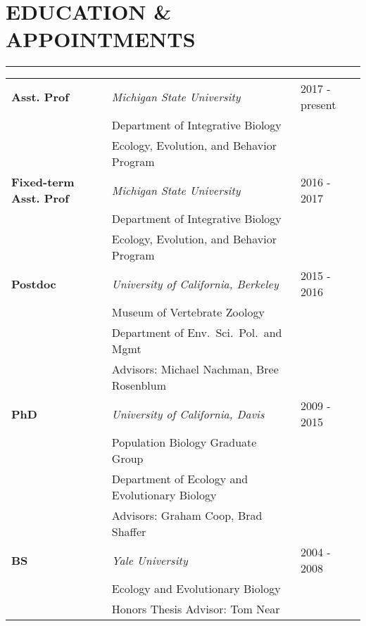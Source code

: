 \documentclass{article}
\begin{document}
\section*{EDUCATION \& APPOINTMENTS}
\vspace{-0.6cm}
\rule{470pt}{0.4pt}
%
\begin{tabular}{p{} p{} p{}} 
\\
\bf{Asst. Prof} & \it{Michigan State University} & \hfill 2017 - present\\
 & \hspace{0.5cm}Department of Integrative Biology & \\
 & \hspace{0.5cm}Ecology, Evolution, and Behavior Program& \\
%
%
\bf{Fixed-term Asst. Prof} & \it{Michigan State University} & \hfill 2016 - 2017\\
 & \hspace{0.5cm}Department of Integrative Biology & \\
 & \hspace{0.5cm}Ecology, Evolution, and Behavior Program& \\
%
%
\bf{Postdoc} & \it{University of California, Berkeley} & \hfill 2015 - 2016\\
 & \hspace{0.5cm}Museum of Vertebrate Zoology & \\
 & \hspace{0.5cm}Department of Env.\ Sci.\ Pol.\ and Mgmt& \\
 & \hspace{0.5cm}Advisors: Michael Nachman, Bree Rosenblum & \\ 
%
%
\bf{PhD} & \it{University of California, Davis}  & \hfill 2009 - 2015\\
 & \hspace{0.5cm}Population Biology Graduate Group & \\
 & \hspace{0.5cm}Department of Ecology and Evolutionary Biology & \\
 & \hspace{0.5cm}Advisors: Graham Coop, Brad Shaffer & \\ 
%
%
\textbf{BS} & \it{Yale University} & \hfill 2004 - 2008 \\
& \hspace{0.5cm}Ecology and Evolutionary Biology & \\
& \hspace{0.5cm}Honors Thesis Advisor: Tom Near & \\
\end{tabular}
%
\vspace{0.1cm}
\end{document}
